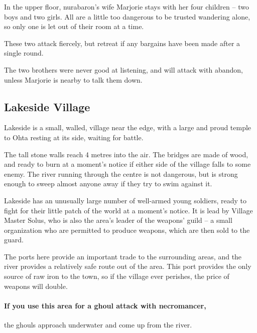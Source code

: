 \begin{multicols}{2}
\label{redFamily}

In the upper floor, \gls{nurabaron}'s wife Marjorie stays with her four children -- two boys and two girls.  All are a little too dangerous to be trusted wandering alone, so only one is let out of their room at a time.

These two attack fiercely, but retreat if any bargains have been made after a single round.


The two brothers were never good at listening, and will attack with abandon, unless Marjorie is nearby to talk them down.



\subsection{Lakeside Village}
\label{lakeside}

Lakeside is a small, walled, village near the \gls{edge}, with a large and proud temple to Ohta resting at its side, waiting for battle.

The tall stone walls reach 4 metres into the air.
The bridges are made of wood, and ready to burn at a moment's notice if either side of the village falls to some enemy.
The river running through the centre is not dangerous, but is strong enough to sweep almost anyone away if they try to swim against it.

Lakeside has an unusually large number of well-armed young soldiers, ready to fight for their little patch of the world at a moment's notice.
It is lead by Village Master Solus, who is also the area's leader of the weapons' guild -- a small organization who are permitted to produce weapons, which are then sold to the \gls{guard}.

The ports here provide an important trade to the surrounding areas, and the river provides a relatively safe route out of the area.
This port provides the only  source of raw iron to the town, so if the village ever perishes, the price of weapons will double.

\paragraph{If you use this area for a ghoul attack with \gls{necromancer},}
the ghouls approach underwater and come up from the river.


\end{multicols}

